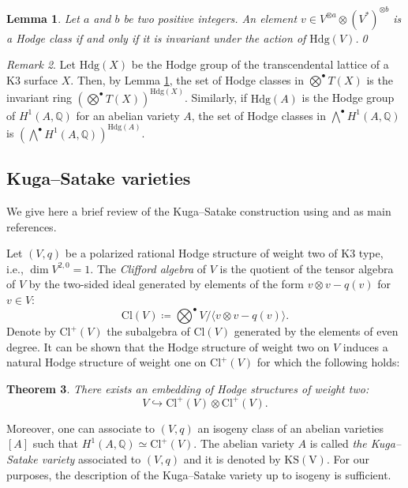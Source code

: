 \documentclass[11pt,twoside,a4paper]{amsart}
\newcommand{\0}{\mathscr{O}}
\newcommand{\Q}{\mathbb{Q}}
\theoremstyle{plain}
\newtheorem{thm}{Theorem}[section]
\newtheorem{lem}[thm]{Lemma}
\theoremstyle{definition}
\theoremstyle{remark}
\newtheorem{rmk}[thm]{Remark}
\begin{document}
\begin{lem}\cite[Sec.\ 2]{ribet1983hodge}
\label{Lem.: Hodge classes= invariant classes}
Let $a$ and $b$ be two positive integers. An element $v\in V^{\otimes a}\otimes (V^*)^{\otimes b}$ is a Hodge class if and only if it is invariant under the action of $\mathrm{Hdg}(V)$.\qed
\end{lem}
\begin{rmk}
\label{rmk.: Hodge classes and Hodge group}
Let $\mathrm{Hdg}(X)$ be the Hodge group of the transcendental lattice of a K3 surface $X$. Then, by Lemma \ref{Lem.: Hodge classes= invariant classes}, the set of Hodge classes in $\bigotimes^{\bullet} T(X)$ is the invariant ring $(\bigotimes^{\bullet} T(X))^{\mathrm{Hdg}(X)}$. Similarly, if $\mathrm{Hdg}(A)$ is the Hodge group of $H^1(A,\Q)$ for an abelian variety $A$, the set of Hodge classes in $\bigwedge^{\bullet}H^1(A,\Q)$ is $(\bigwedge^{\bullet}H^1(A,\Q))^{\mathrm{Hdg}(A)}$.  
\end{rmk}

\subsection{Kuga--Satake varieties}
\label{Sec. Kuga-Satake}
We give here a brief review of the Kuga--Satake construction using \cite{van2000kuga} and \cite[Ch.\ 4]{huybrechtsK3surfaces} as main references.

\smallskip

Let $(V,q)$ be a polarized rational Hodge structure of weight two of K3 type, i.e., $\dim V^{2,0}=1$. The \textit{Clifford algebra} of $V$ is the quotient of the tensor algebra of $V$ by the two-sided ideal generated by elements of the form $v\otimes v-q(v)$ for $v\in V$:
\[\mathrm{Cl}(V)\coloneqq \textstyle\bigotimes^{\bullet}V/\langle v\otimes v-q(v)\rangle.\]
Denote by $\mathrm{Cl}^+(V)$ the subalgebra of $\mathrm{Cl}(V)$ generated by the elements of even degree. 
It can be shown that the Hodge structure of weight two on $V$ induces a natural Hodge structure of weight one on $\mathrm{Cl}^+(V)$ for which the following holds:
\begin{thm}\cite[Prop.\ 2.6]{huybrechtsK3surfaces}
\label{thm: K-S construction}
There exists an embedding of Hodge structures of weight two:
\[V\hookrightarrow \mathrm{Cl}^+(V)\otimes \mathrm{Cl}^+(V).\]
\end{thm}
Moreover, one can associate to $(V,q)$ an isogeny class of an abelian varieties $[A]$ such that
$H^1(A,\Q)\simeq\mathrm{Cl}^+(V)$.
The abelian variety $A$ is called \textit{the Kuga--Satake variety} associated to $(V,q)$ and it is denoted by $\mathrm{KS(V)}$.
For our purposes, the description of the Kuga--Satake variety up to isogeny is sufficient.
\end{document}
